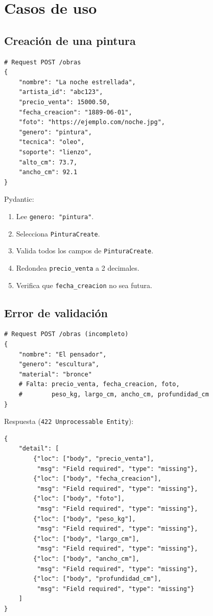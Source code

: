\documentclass[12pt,a4paper]{article}
\begin{document}
\section{Casos de uso}

\subsection{Creación de una pintura}

\begin{lstlisting}
# Request POST /obras
{
    "nombre": "La noche estrellada",
    "artista_id": "abc123",
    "precio_venta": 15000.50,
    "fecha_creacion": "1889-06-01",
    "foto": "https://ejemplo.com/noche.jpg",
    "genero": "pintura",
    "tecnica": "oleo",
    "soporte": "lienzo",
    "alto_cm": 73.7,
    "ancho_cm": 92.1
}
\end{lstlisting}

Pydantic:
\begin{enumerate}
    \item Lee \texttt{genero: "pintura"}.
    \item Selecciona \texttt{PinturaCreate}.
    \item Valida todos los campos de \texttt{PinturaCreate}.
    \item Redondea \texttt{precio\_venta} a 2 decimales.
    \item Verifica que \texttt{fecha\_creacion} no sea futura.
\end{enumerate}

\subsection{Error de validación}

\begin{lstlisting}
# Request POST /obras (incompleto)
{
    "nombre": "El pensador",
    "genero": "escultura",
    "material": "bronce"
    # Falta: precio_venta, fecha_creacion, foto,
    #        peso_kg, largo_cm, ancho_cm, profundidad_cm
}
\end{lstlisting}

Respuesta (\texttt{422 Unprocessable Entity}):

\begin{lstlisting}
{
    "detail": [
        {"loc": ["body", "precio_venta"],
         "msg": "Field required", "type": "missing"},
        {"loc": ["body", "fecha_creacion"],
         "msg": "Field required", "type": "missing"},
        {"loc": ["body", "foto"],
         "msg": "Field required", "type": "missing"},
        {"loc": ["body", "peso_kg"],
         "msg": "Field required", "type": "missing"},
        {"loc": ["body", "largo_cm"],
         "msg": "Field required", "type": "missing"},
        {"loc": ["body", "ancho_cm"],
         "msg": "Field required", "type": "missing"},
        {"loc": ["body", "profundidad_cm"],
         "msg": "Field required", "type": "missing"}
    ]
}
\end{lstlisting}
\end{document}
